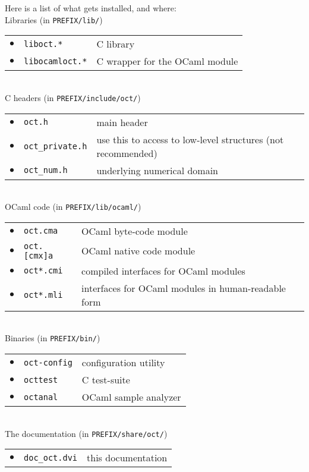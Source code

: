 \documentclass[twosides]{report}
\begin{document}
\noindent
Here is a list of what gets installed, and where:\\
\quad Libraries (in {\tt PREFIX/lib/})\\
\quad\quad \begin{tabular}{lll}
$\bullet$ & {\tt liboct.*} &\qquad C library\\
$\bullet$ & {\tt libocamloct.*} &\qquad C wrapper for the OCaml module\\
\end{tabular}\\
\quad C headers (in {\tt PREFIX/include/oct/})\\
\quad\quad \begin{tabular}{lll}
$\bullet$ & {\tt oct.h} &\qquad main header\\
$\bullet$ & {\tt oct\_private.h} &\qquad use this to access to low-level structures (not recommended)\\
$\bullet$ & {\tt oct\_num.h} & \qquad underlying numerical domain\\
\end{tabular}\\
\quad OCaml code (in {\tt PREFIX/lib/ocaml/})\\
\quad\quad \begin{tabular}{lll}
$\bullet$ & {\tt oct.cma} &\qquad OCaml byte-code module\\
$\bullet$ & {\tt oct.[cmx]a} &\qquad OCaml native code module\\
$\bullet$ & {\tt oct*.cmi} &\qquad compiled interfaces for OCaml modules\\
$\bullet$ & {\tt oct*.mli} &\qquad interfaces for OCaml modules
in human-readable form\\
\end{tabular}\\
\quad Binaries (in {\tt PREFIX/bin/})\\
\quad\quad \begin{tabular}{lll}
$\bullet$ & {\tt oct-config} &\qquad configuration utility\\
$\bullet$ & {\tt octtest} &\qquad C test-suite\\
$\bullet$ & {\tt octanal} &\qquad OCaml sample analyzer\\
\end{tabular}\\
\quad The documentation (in {\tt PREFIX/share/oct/})\\
\quad\quad \begin{tabular}{lll}
$\bullet$ & {\tt doc\_oct.dvi} &\qquad this documentation\\
\end{tabular}
\end{document}
